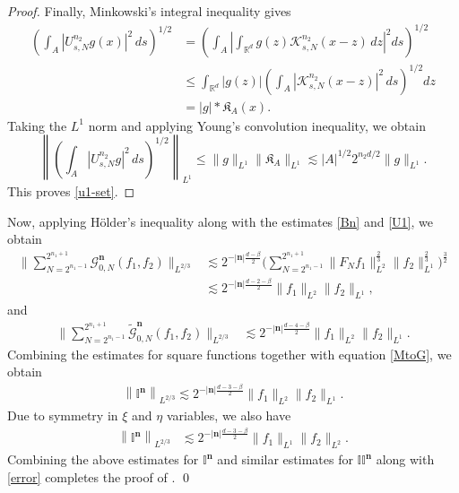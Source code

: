 \documentclass[a4paper,reqno]{amsart}
\newcounter{old}
\numberwithin{equation}{section}
\begin{document}
\begin{proof}
		Finally, Minkowski's integral inequality gives
		\begin{align*}
			\left(
			\int_A
			|U_{s,N}^{n_2}g(x)|^2\,ds
			\right)^{1/2}
			&=
			\left(
			\int_A
			\left|
			\int_{\mathbb R^d}
			g(z)\mathcal K_{s,N}^{n_2}(x-z)\,dz
			\right|^2
			ds
			\right)^{1/2}
			\\
			&\leq
			\int_{\mathbb R^d}
			|g(z)|
			\left(
			\int_A
			|\mathcal K_{s,N}^{n_2}(x-z)|^2\,ds
			\right)^{1/2}
			dz
			\\
			&=
			|g|*\mathfrak K_A(x).
		\end{align*}
		Taking the \(L^1\) norm and applying Young's convolution
		inequality, we obtain
		\[
		\left\|
		\left(
		\int_A |U_{s,N}^{n_2}g|^2\,ds
		\right)^{1/2}
		\right\|_{L^1}
		\leq
		\|g\|_{L^1}\|\mathfrak K_A\|_{L^1}
		\lesssim
		|A|^{1/2}2^{n_2d/2}\|g\|_{L^1}.
		\]
		This proves \eqref{u1-set}.
	\end{proof}
	
	
	
	Now, applying H\"older's inequality along with the estimates \eqref{Bn} and \eqref{U1}, we obtain
	\begin{align*}
		\Bigg\|\sum_{N=2^{n_1-1}}^{2^{n_1+1}}\mathcal{G}^{\mathbf{n}}_{0,N}(f_1,f_2)\Bigg\|_{L^{2/3}}&\lesssim2^{-|\mathbf{n}|\frac{d-\beta}{2}}\bigg(\sum_{N=2^{n_1-1}}^{2^{n_1+1}}\|F_Nf_1\|_{L^2}^{\frac{2}{3}}\|f_2\|_{L^1}^{\frac{2}{3}}\bigg)^{\frac{3}{2}}\\
		&\lesssim2^{-|\mathbf{n}|\frac{d-2-\beta}{2}}\|f_1\|_{L^2}\|f_2\|_{L^1},
	\end{align*}
	and
	\begin{align*}
		\Bigg\|\sum_{N=2^{n_1-1}}^{2^{n_1+1}}\tilde{\mathcal{G}}^{\mathbf{n}}_{0,N}(f_1,f_2)\Bigg\|_{L^{2/3}}&\lesssim2^{-|\mathbf{n}|\frac{d-4-\beta}{2}}\|f_1\|_{L^2}\|f_2\|_{L^1}. 
	\end{align*}
	Combining the estimates for square functions together with equation \eqref{MtoG}, we obtain 
	\begin{align}\label{In1}
		\left\|\mathbb{I}^{\mathbf{n}}\right\|_{L^{2/3}}\lesssim2^{-|\mathbf{n}|\frac{d-3-\beta}{2}}\|f_1\|_{L^2}\|f_2\|_{L^1}.
	\end{align}
	Due to symmetry in $\xi$ and $\eta$ variables, we also have 
	\begin{align*}
		\left\|\mathbb{I}^{\mathbf{n}}\right\|_{L^{2/3}}&\lesssim2^{-|\mathbf{n}|\frac{d-3-\beta}{2}}\|f_1\|_{L^1}\|f_2\|_{L^2}.
	\end{align*}
	Combining the above estimates for $\mathbb{I}^{\mathbf{n}}$ and similar estimates for $\mathbb{II}^{\mathbf{n}}$ along with \eqref{error} completes the proof of .
	\qed	
\end{document}
